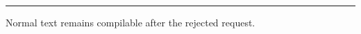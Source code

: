 \documentclass[twocolumn]{article}
\begin{document}
\begin{wideband}
\rule{1pt}{1.2\textheight}
\end{wideband}
Normal text remains compilable after the rejected request.
\end{document}
